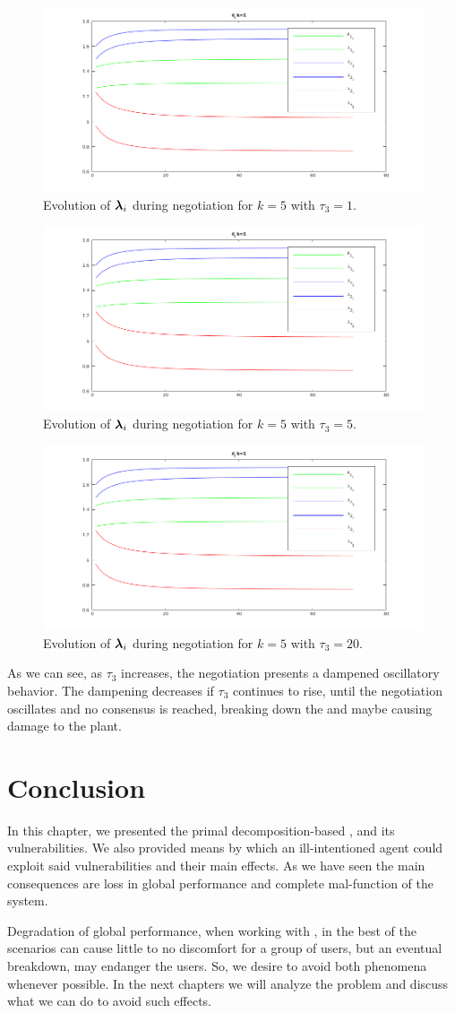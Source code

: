 \documentclass[../main.tex]{subfiles}
\begin{document}
\begin{figure}[h]
  \centering
  \includegraphics[width=.5\textwidth]{../img/example_theta.png}
  \caption{Evolution of $\boldsymbol{\lambda}_i$ during negotiation for $k=5$ with $\tau_{3}=1$. }\label{fig:example_vary_tau_lambda_tau_1}
\end{figure}
\begin{figure}[h]
  \centering
  \includegraphics[width=.5\textwidth]{../img/example_theta.png}
  \caption{Evolution of $\boldsymbol{\lambda}_i$ during negotiation for $k=5$ with $\tau_{3}=5$. }\label{fig:example_vary_tau_lambda_tau_5}
\end{figure}

\begin{figure}[h]
  \centering
  \includegraphics[width=.5\textwidth]{../img/example_theta.png}
  \caption{Evolution of $\boldsymbol{\lambda}_i$ during negotiation for $k=5$ with $\tau_{3}=20$. }\label{fig:example_vary_tau_lambda_tau_20}
\end{figure}
As we can see, as $\tau_{3}$ increases, the negotiation presents a dampened oscillatory behavior.
The dampening decreases if $\tau_{3}$ continues to rise, until the negotiation oscillates and no consensus is reached, breaking down the \dmpc{} and maybe causing damage to the plant.

\section{Conclusion}\label{sec:conclusion}
In this chapter, we presented the primal decomposition-based \dmpc{}, and its vulnerabilities.
We also provided means by which an ill-intentioned agent could exploit said vulnerabilities and their main effects.
As we have seen the main consequences are loss in global performance and complete mal-function of the system.

Degradation of global performance, when working with \cps{}, in the best of the scenarios can cause little to no discomfort for a group of users, but an eventual breakdown, may endanger the users.
So, we desire to avoid both phenomena whenever possible.
In the next chapters we will analyze the problem and discuss what we can do to avoid such effects.
\end{document}
